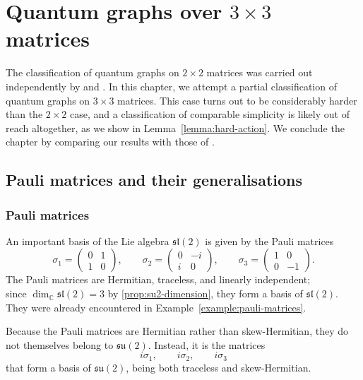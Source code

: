 \chapter{Quantum graphs over \( 3 \times 3 \) matrices}
\label{ch:quantum-graphs-m3}

The classification of quantum graphs on \( 2 \times 2 \) matrices was
carried out independently by \textcite{matsuda22} and \textcite{gromada22}.
In this chapter, we attempt a partial classification of quantum graphs on
\( 3 \times 3 \) matrices. This case turns out to be considerably harder
than the \( 2 \times 2 \) case, and a classification of comparable
simplicity is likely out of reach altogether, as we show in
Lemma~\ref{lemma:hard-action}. We conclude the chapter by comparing our
results with those of \textcite{hayes26}.

\section{Pauli matrices and their generalisations}
\label{sec:pauli-matrices-generalisations}

\subsection{Pauli matrices}
\label{subsec:pauli-matrices-m3}

An important basis of the Lie algebra \( \mathfrak{sl}(2) \)
is given by the Pauli matrices
\[
    \sigma_1 =
    \begin{pmatrix} 0 & 1 \\ 1 & 0
    \end{pmatrix}, \qquad
    \sigma_2 =
    \begin{pmatrix} 0 & -i \\ i & 0
    \end{pmatrix}, \qquad
    \sigma_3 =
    \begin{pmatrix} 1 & 0 \\ 0 & -1
    \end{pmatrix}.
\]
The Pauli matrices are Hermitian, traceless, and linearly independent; \\
since \( \dim_{\mathbb{C}} \mathfrak{sl}(2) = 3 \) by
\ref{prop:su2-dimension}, they form a
basis of \( \mathfrak{sl}(2) \). They were already encountered
in Example~\ref{example:pauli-matrices}.

Because the Pauli matrices are Hermitian rather than skew-Hermitian, they
do not themselves belong to \( \mathfrak{su}(2) \). Instead, it is the
matrices
\[
    i\sigma_1, \qquad i\sigma_2, \qquad i\sigma_3
\]
that form a basis of \( \mathfrak{su}(2) \), being both traceless and
skew-Hermitian.

